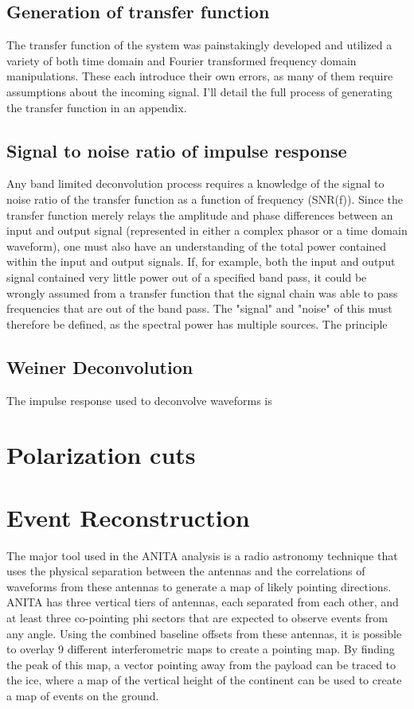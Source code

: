 	\subsection{Generation of transfer function}
		The transfer function of the system was painstakingly developed and utilized a variety of both time domain and Fourier transformed frequency domain manipulations.  These each introduce their own errors, as many of them require assumptions about the incoming signal.  I'll detail the full process of generating the transfer function in an appendix.
	\subsection{Signal to noise ratio of impulse response}
		Any band limited deconvolution process requires a knowledge of the signal to noise ratio of the transfer function as a function of frequency (SNR(f)).  Since the transfer function merely relays the amplitude and phase differences between an input and output signal (represented in either a complex phasor or a time domain waveform), one must also have an understanding of the total power contained within the input and output signals.  If, for example, both the input and output signal contained very little power out of a specified band pass, it could be wrongly assumed from a transfer function that the signal chain was able to pass frequencies that are out of the band pass.
		The "signal" and "noise" of this must therefore be defined, as the spectral power has multiple sources.  The principle   
	\subsection{Weiner Deconvolution}
		The impulse response used to deconvolve waveforms is 

\section{Polarization cuts}

\section{Event Reconstruction}
	The major tool used in the ANITA analysis is a radio astronomy technique that uses the physical separation between the antennas and the correlations of waveforms from these antennas to generate a map of likely pointing directions.  ANITA has three vertical tiers of antennas, each separated from each other, and at least three co-pointing phi sectors that are expected to observe events from any angle.  Using the combined baseline offsets from these antennas, it is possible to overlay 9 different interferometric maps to create a pointing map.  By finding the peak of this map, a vector pointing away from the payload can be traced to the ice, where a map of the vertical height of the continent can be used to create a map of events on the ground.
